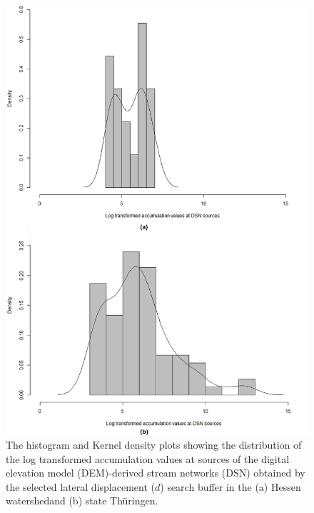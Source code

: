 \begin{figure}[h!]
  \centering
  \hspace{-1cm} \includegraphics[width=1.1\textwidth]{Figures/Fig_S1_2.png}
  \caption{The histogram and Kernel density plots showing the distribution of the log transformed accumulation values at sources of the digital elevation model (DEM)-derived stream networks (DSN) obtained by the selected lateral displacement ($d$) search buffer in the (a) Hessen watershedand (b) state Thüringen.}
  \label{Fig_A_2}
\end{figure}

